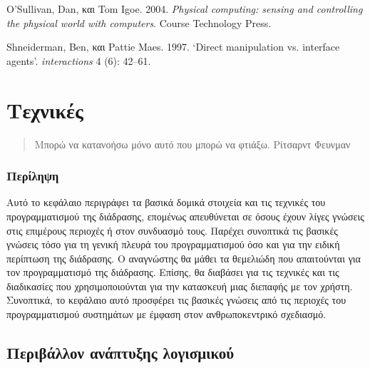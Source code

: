 \documentclass[
]{article}
\begin{document}
O'Sullivan, Dan, και Tom Igoe. 2004. \emph{Physical computing: sensing
and controlling the physical world with computers}. Course Technology
Press.

Shneiderman, Ben, και Pattie Maes. 1997. {`Direct manipulation vs.
interface agents'}. \emph{interactions} 4 (6): 42--61.

\hypertarget{ux3c4ux3b5ux3c7ux3bdux3b9ux3baux3adux3c2}{%
\section{Τεχνικές}\label{ux3c4ux3b5ux3c7ux3bdux3b9ux3baux3adux3c2}}

\begin{quote}
Μπορώ να κατανοήσω μόνο αυτό που μπορώ να φτιάξω. Ρίτσαρντ Φευνμαν
\end{quote}

\hypertarget{ux3c0ux3b5ux3c1ux3afux3bbux3b7ux3c8ux3b7}{%
\subsubsection{Περίληψη}\label{ux3c0ux3b5ux3c1ux3afux3bbux3b7ux3c8ux3b7}}

Αυτό το κεφάλαιο περιγράφει τα βασικά δομικά στοιχεία και τις τεχνικές
του προγραμματισμού της διάδρασης, επομένως απευθύνεται σε όσους έχουν
λίγες γνώσεις στις επιμέρους περιοχές ή στον συνδυασμό τους. Παρέχει
συνοπτικά τις βασικές γνώσεις τόσο για τη γενική πλευρά του
προγραμματισμού όσο και για την ειδική περίπτωση της διάδρασης. Ο
αναγνώστης θα μάθει τα θεμελιώδη που απαιτούνται για τον προγραμματισμό
της διάδρασης. Επίσης, θα διαβάσει για τις τεχνικές και τις διαδικασίες
που χρησιμοποιούνται για την κατασκευή μιας διεπαφής με τον χρήστη.
Συνοπτικά, το κεφάλαιο αυτό προσφέρει τις βασικές γνώσεις από τις
περιοχές του προγραμματισμού συστημάτων με έμφαση στον ανθρωποκεντρικό
σχεδιασμό.

\hypertarget{ux3c0ux3b5ux3c1ux3b9ux3b2ux3acux3bbux3bbux3bfux3bd-ux3b1ux3bdux3acux3c0ux3c4ux3c5ux3beux3b7ux3c2-ux3bbux3bfux3b3ux3b9ux3c3ux3bcux3b9ux3baux3bfux3cd}{%
\subsection{Περιβάλλον ανάπτυξης
λογισμικού}\label{ux3c0ux3b5ux3c1ux3b9ux3b2ux3acux3bbux3bbux3bfux3bd-ux3b1ux3bdux3acux3c0ux3c4ux3c5ux3beux3b7ux3c2-ux3bbux3bfux3b3ux3b9ux3c3ux3bcux3b9ux3baux3bfux3cd}}
\end{document}
